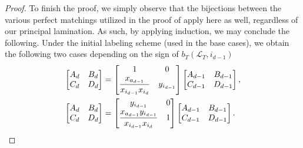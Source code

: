 \documentclass[10pt,a4paper]{amsart}
\numberwithin{equation}{section}
\theoremstyle{definition}
\begin{document}
\begin{proof}
To finish the proof, we simply observe that the bijections between the various perfect matchings utilized in the proof of \cite[Proposition 5.5]{MW13} apply here as well, regardless of our principal lamination. As such, by applying induction, we may conclude the following. Under the initial labeling scheme (used in the base cases), we obtain the following two cases depending on the sign of $b_T(\mathcal{L}_T, i_{d-1})$
\begin{align*}
 \begin{bmatrix}
 A_d & B_d\\
 C_d & D_d
 \end{bmatrix}&=
\begin{bmatrix}
 1 & 0\vspace{1mm}\\
 \dfrac{x_{a_{d-1}}}{x_{i_{d-1}}x_{i_d}} & y_{i_{d-1}}
\end{bmatrix}
\begin{bmatrix}
 A_{d-1} & B_{d-1}\\
 C_{d-1} & D_{d-1}
 \end{bmatrix},
 \\
 \begin{bmatrix}
 A_d & B_d\\
 C_d & D_d
 \end{bmatrix}&=
\begin{bmatrix}
 y_{i_{d-1}} & 0\vspace{1mm}\\
 \dfrac{x_{a_{d-1}}y_{i_{d-1}}}{x_{i_{d-1}}x_{i_d}} & 1
\end{bmatrix}
\begin{bmatrix}
 A_{d-1} & B_{d-1}\\
 C_{d-1} & D_{d-1}
 \end{bmatrix}.
\end{align*}


\end{proof}
\end{document}
